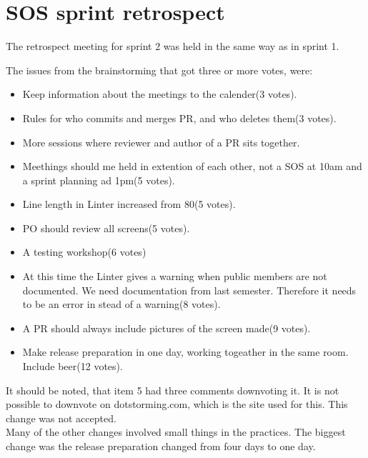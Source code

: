 \section{SOS sprint retrospect}

The retrospect meeting for sprint 2 was held in the same way as in sprint 1.

The issues from the brainstorming that got three or more votes, were:
\begin{itemize}
    \item Keep information about the meetings to the calender(3 votes).
    \item Rules for who commits and merges \gls{PR}, and who deletes them(3 votes).
    \item More sessions where reviewer and author of a \gls{PR} sits together. 
    \item Meethings should me held in extention of each other, not a SOS at 10am and a sprint planning ad 1pm(5 votes).  
    \item Line length in Linter increased from 80(5 votes).    \item PO should review all screens(5 votes).
    \item A testing workshop(6 votes)
    \item At this time the Linter gives a warning when public members are not documented. We need documentation from last semester. Therefore it needs to be an error in stead of a warning(8 votes).
    \item A \gls{PR} should always include pictures of the screen made(9 votes).
    \item Make release preparation in one day, working togeather in the same room. Include beer(12 votes).
\end{itemize}

It should be noted, that item 5 had three comments downvoting it. It is not possible to downvote on dotstorming.com, which is the site used for this. This change was not accepted.\\
Many of the other changes involved small things in the practices. The biggest change was the release preparation changed from four days to one day.\\
